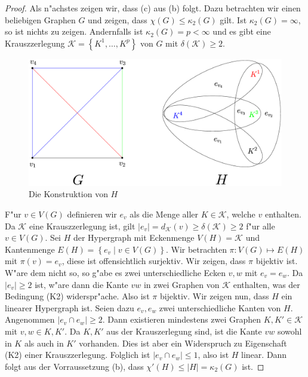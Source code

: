 \begin{proof}
  Als n"achstes zeigen wir, dass (c) aus (b) folgt. 
  Dazu betrachten wir einen beliebigen Graphen $G$ und zeigen, dass $\chi(G) \leq \kappa_{2}(G)$ gilt. Ist $\kappa_{2}(G) = \infty$, so ist nichts zu zeigen. Andernfalls ist $\kappa_{2}(G) = p < \infty $ und es gibt eine Krauszzerlegung $\mathcal{K}= \left\{ K^{1},\dots,K^{p} \right\}$ von $G$ mit $\delta(\mathcal{K}) \geq 2 $.  
  \begin{figure}[h]
    \centering
    \includegraphics[width=\textwidth]{images/k4krausztohypergraph.eps}
    \caption{Die Konstruktion von $H$}
    \label{fig:konstruktionH}
  \end{figure}
  F"ur $v\in V(G)$ definieren wir $e_v$ als die Menge aller $K\in \mathcal{K}$, welche $v$ enthalten. Da $\mathcal{K}$ eine Krauszzerlegung ist, gilt $|e_v| = d_{\mathcal{K}}(v)\geq \delta(\mathcal{K}) \geq 2$ f"ur alle $v \in V(G)$. Sei $H$ der Hypergraph mit Eckenmenge $V(H) = \mathcal{K}$ und Kantenmenge $E(H) = \left\{ e_v\;|\; v\in V(G) \right\}$. Wir betrachten $\pi: V(G) \mapsto E(H)$ mit $\pi(v) = e_v$, diese ist offensichtlich surjektiv. Wir zeigen, dass $\pi$ bijektiv ist. W"are dem nicht so, so g"abe es zwei unterschiedliche Ecken $v,w$ mit $e_v = e_w$. 
  Da $|e_v| \geq 2$ ist,  w"are dann die Kante $vw$ in zwei Graphen von $\mathcal{K}$ enthalten, was der Bedingung (K2) widerspr"ache. Also ist $\pi$ bijektiv.
  Wir zeigen nun, dass $H$ ein linearer Hypergraph ist. 
  Seien dazu $e_{v},e_{w} $ zwei unterschiedliche Kanten von $H$.
  Angenommen $|e_{v}\cap e_{w}| \geq 2$. Dann existieren mindestens zwei Graphen $K,K' \in \mathcal{K}$ mit $v,w \in K,K'$. Da $K,K'$ aus der Krauszerlegung sind, ist die Kante $vw$ sowohl in $K$ als auch in $K'$ vorhanden. Dies ist aber ein Widerspruch zu Eigenschaft (K2) einer Krauszzerlegung.
  Folglich ist $|e_{v}\cap e_{w}| \leq 1$, also ist $H$ linear. Dann folgt aus der Vorraussetzung (b), dass $\chi'(H) \leq |H| = \kappa_{2}(G)$ ist.

\end{proof}
